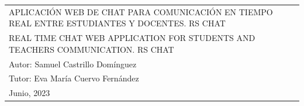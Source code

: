 \begin{table}[ht]
\begin{tabular}{p{1\linewidth}}
		\LARGE{\uppercase{Aplicación web de chat para comunicación en tiempo real entre estudiantes y docentes. RS Chat}}
		\\[5ex]

		\LARGE{\uppercase{Real time chat web application for students and teachers communication. RS Chat}}
		\\[8ex]

		\hfill\large{Autor: Samuel Castrillo Domínguez}
		\\[3pt]
		\hfill\large{Tutor: Eva María Cuervo Fernández}
		\\[5ex]

		\huge{Junio, 2023}
	\end{tabular}
\end{table}
